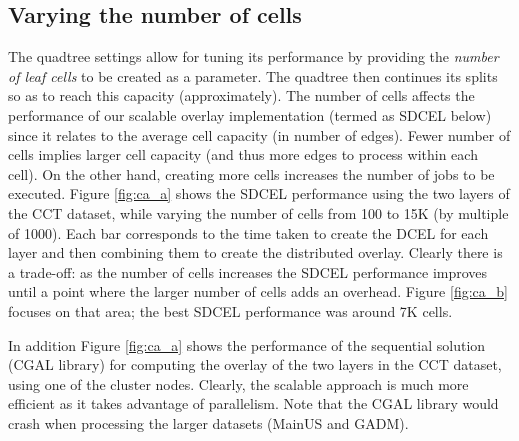 \subsection{Varying the number of cells}
The quadtree settings allow for tuning its performance by providing the \textit{number of leaf cells} to be created as a parameter. The quadtree then continues its splits so as to reach this capacity (approximately). The number of cells affects the performance of our scalable overlay implementation (termed as SDCEL below) since it relates to the average cell capacity (in number of edges). 
Fewer number of cells implies larger cell capacity (and thus more edges to process within each cell). On the other hand, creating more cells increases the number of jobs to be executed. 
Figure \ref{fig:ca_a} shows the SDCEL performance using the two layers of the CCT dataset, while varying the number of cells from 100 to 15K (by multiple of 1000). 
Each bar corresponds to the time taken to create the DCEL for each layer and then combining them to create the distributed overlay. 
Clearly there is a trade-off: as the number of cells increases the SDCEL performance improves until a point where the larger number of cells adds an overhead.   
Figure \ref{fig:ca_b} focuses on that area; the best SDCEL performance was around 7K cells.

In addition Figure \ref{fig:ca_a} shows the performance of the sequential solution (CGAL library) for computing the overlay of the two layers in the CCT dataset, using one of the cluster nodes. 
Clearly, the scalable approach is much more efficient as it takes advantage of parallelism. Note that the CGAL library would crash when processing the larger datasets (MainUS and GADM).

